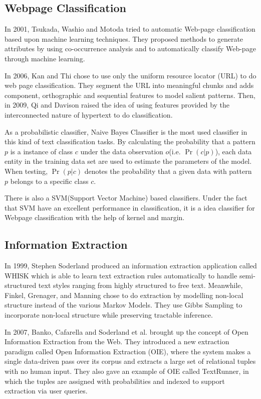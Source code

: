 \subsection{Webpage Classification}
In 2001, Tsukada, Washio and Motoda tried to automatic Web-page classification based upon machine learning techniques. They proposed methods to generate attributes by using co-occurrence analysis and to automatically classify Web-page through machine learning\cite{tsukada2001automatic}. 

In 2006, Kan and Thi chose to use only the uniform resource locator (URL) to do web page classification. They segment the URL into meaningful chunks and adds component, orthographic and sequential features to model salient patterns\cite{kan2005fast}. Then, in 2009, Qi and Davison raised the idea of using features provided by the interconnected nature of hypertext to do classification\cite{Qi:2009:WPC:1459352.1459357}.

As a probabilistic classifier, Naive Bayes Classifier is the most used classifier in this kind of text classification tasks\cite{cichosznaive}. By calculating the probability that a pattern $p$ is a instance of class $c$ under the data observation $o$(i.e. $\Pr(c\vert p)$), each data entity in the training data set are used to estimate the parameters of the model. When testing, $\Pr(p\vert c)$ denotes the probability that a given data with pattern $p$ belongs to a specific class $c$.

There is also a SVM(Support Vector Machine) based classifiers. Under the fact that SVM have an excellent performance in classification\cite{tong2002support}, it is a idea classifier for Webpage classification with the help of kernel and margin.


\subsection{Information Extraction}
In 1999, Stephen Soderland produced an information extraction application called WHISK which is able to learn text extraction rules automatically to handle semi-structured text styles ranging from highly structured to free text\cite{soderland1999learning}. Meanwhile, Finkel, Grenager, and Manning chose to do extraction by modelling non-local structure instead of the various Markov Models. They use Gibbs Sampling to incorporate non-local structure while preserving tractable inference\cite{finkel2005incorporating}. 

In 2007, Banko, Cafarella and Soderland et al. brought up the concept of Open Information Extraction from the Web. They introduced a new extraction paradigm called Open Information Extraction (OIE), where the system makes a single data-driven pass over its corpus and extracts a large set of relational tuples with no human input. They also gave an example of OIE called TextRunner, in which the tuples are assigned with probabilities and indexed to support extraction via user queries\cite{banko2007open}.

